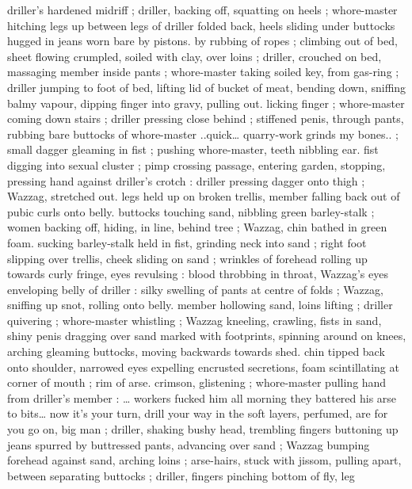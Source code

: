 driller's hardened midriff ; driller, backing off, squatting on heels ; 
whore-master hitching legs up between legs of driller folded back, 
heels sliding under buttocks hugged in jeans worn bare by pistons. 
by rubbing of ropes ; climbing out of bed, sheet flowing crumpled, 
soiled with clay, over loins ; driller, crouched on bed, massaging 
member inside pants ; whore-master taking soiled key, from gas-ring 
; driller jumping to foot of bed, lifting lid of bucket of meat, bending 
down, sniffing balmy vapour, dipping finger into gravy, pulling out. 
licking finger ; whore-master coming down stairs ; driller pressing 
close behind ; stiffened penis, through pants, rubbing bare buttocks 
of whore-master{\td} {\gl}..quick{\ldots} quarry-work grinds my bones..{\gr} ; small 
dagger gleaming in fist ; pushing whore-master, teeth nibbling ear. 
fist digging into sexual cluster ; pimp crossing passage, entering 
garden, stopping, pressing hand against driller's crotch : driller 
pressing dagger onto thigh ; Wazzag, stretched out. legs held up on 
broken trellis, member falling back out of pubic curls onto belly. 
buttocks touching sand, nibbling green barley-stalk ; women backing 
off, hiding, in line, behind tree ; Wazzag, chin bathed in green foam. 
sucking barley-stalk held in fist, grinding neck into sand ; right foot 
slipping over trellis, cheek sliding on sand ; wrinkles of forehead 
rolling up towards curly fringe, eyes revulsing : blood throbbing in 
throat, Wazzag's eyes enveloping belly of driller : silky swelling of 
pants at centre of folds ; Wazzag, sniffing up snot, rolling onto belly. 
member hollowing sand, loins lifting ; driller quivering ; whore-master 
whistling ; Wazzag kneeling, crawling, fists in sand, shiny penis 
dragging over sand marked with footprints, spinning around on 
knees, arching gleaming buttocks, moving backwards towards shed. 
chin tipped back onto shoulder, narrowed eyes expelling encrusted 
secretions, foam scintillating at corner of mouth ; rim of arse. 
crimson, glistening ; whore-master pulling hand from driller's 
member : {\td} {\gl} {\ldots} workers fucked him all morning{\td} they battered his 
arse to bits{\ldots} now it's your turn, drill your way in{\td} the soft layers, 
perfumed, are for you{\td} go on, big man {\gr} ; driller, shaking bushy head, 
trembling fingers buttoning up jeans spurred by buttressed pants, 
advancing over sand ; Wazzag bumping forehead against sand, 
arching loins ; arse-hairs, stuck with jissom, pulling apart, between 
separating buttocks ; driller, fingers pinching bottom of fly, leg 
